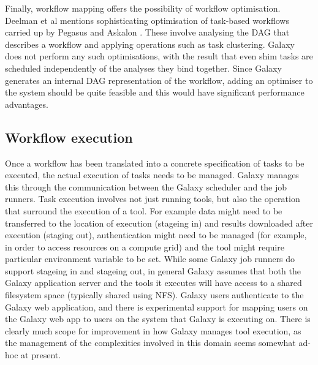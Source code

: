 \documentclass[a4paper,10pt]{scrreprt} \usepackage[utf8]{inputenc}
\begin{document}
Finally, workflow mapping offers the possibility of workflow optimisation. Deelman et al mentions sophisticating optimisation of task-based workflows carried up by Pegasus \cite{deelman_pegasus:_2005} and Askalon \cite{fahringer_askalon:_2005}. These involve analysing the DAG that describes a workflow and applying operations such as task clustering. Galaxy does not perform any such optimisations, with the result that even shim tasks are scheduled independently of the analyses they bind together. Since Galaxy generates an internal DAG representation of the workflow, adding an optimiser to the system should be quite feasible and this would have significant performance advantages.

\subsection{Workflow execution}

Once a workflow has been translated into a concrete specification of tasks to be executed, the actual execution of tasks needs to be managed. Galaxy manages this through the communication between the Galaxy scheduler and the job runners. Task execution involves not just running tools, but also the operation that surround the execution of a tool. For example data might need to be transferred to the location of execution (stageing in) and results downloaded after execution (staging out), authentication might need to be managed (for example, in order to access resources on a compute grid) and the tool might require particular environment variable to be set. While some Galaxy job runners do support stageing in and stageing out, in general Galaxy assumes that both the Galaxy application server and the tools it executes will have access to a shared filesystem space (typically shared using NFS). Galaxy users authenticate to the Galaxy web application, and there is experimental support for mapping users on the 
Galaxy web app to users on the system that Galaxy is executing on. There is clearly much scope for improvement in how Galaxy manages tool execution, as the management of the complexities involved in this domain seems somewhat ad-hoc at present.
\end{document}
